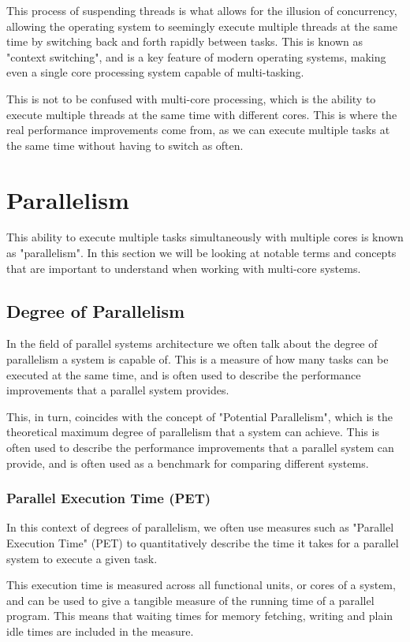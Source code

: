 \documentclass{article}
\begin{document}
This process of suspending threads is what allows for the illusion of concurrency, allowing the operating system to seemingly execute multiple threads at the same time by switching back and forth rapidly between tasks. This is known as "context switching", and is a key feature of modern operating systems, making even a single core processing system capable of multi-tasking.

This is not to be confused with multi-core processing, which is the ability to execute multiple threads at the same time with different cores. This is where the real performance improvements come from, as we can execute multiple tasks at the same time without having to switch as often.

\section{Parallelism}
This ability to execute multiple tasks simultaneously with multiple cores is known as "parallelism". In this section we will be looking at notable terms and concepts that are important to understand when working with multi-core systems.
\subsection{Degree of Parallelism}

In the field of parallel systems architecture we often talk about the degree of parallelism a system is capable of. This is a measure of how many tasks can be executed at the same time, and is often used to describe the performance improvements that a parallel system provides.

This, in turn, coincides with the concept of "Potential Parallelism", which is the theoretical maximum degree of parallelism that a system can achieve. This is often used to describe the performance improvements that a parallel system can provide, and is often used as a benchmark for comparing different systems.

\subsubsection{Parallel Execution Time (PET)}

In this context of degrees of parallelism, we often use measures such as "Parallel Execution Time" (PET) to quantitatively describe the time it takes for a parallel system to execute a given task. 

This execution time is measured across all functional units, or cores of a system, and can be used to give a tangible measure of the running time of a parallel program. This means that waiting times for memory fetching, writing and plain idle times are included in the measure.
\end{document}
